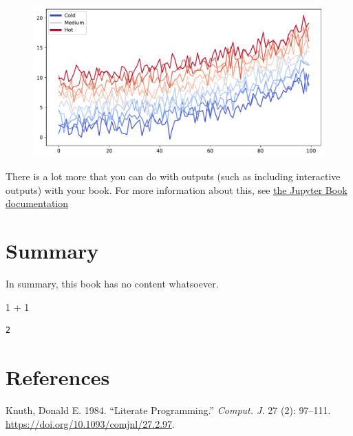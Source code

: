 \documentclass[
  letterpaper,
  DIV=11,
  numbers=noendperiod]{scrreprt}
\newenvironment{Shaded}{\begin{snugshade}}{\end{snugshade}}
\newcommand{\DecValTok}[1]{\textcolor[rgb]{0.68,0.00,0.00}{#1}}
\newcommand{\OperatorTok}[1]{\textcolor[rgb]{0.37,0.37,0.37}{#1}}
\newlength{\cslhangindent}
\newlength{\cslentryspacingunit} %
\newenvironment{CSLReferences}[2] %
 {%
  \setlength{\parindent}{0pt}
  \ifodd #1
  \let\oldpar\par
  \def\par{\hangindent=\cslhangindent\oldpar}
  \fi
  \setlength{\parskip}{#2\cslentryspacingunit}
 }%
 {}
\begin{document}
\begin{figure}[H]

{\centering \includegraphics{content/jupyterbook-demo/notebooks_files/figure-pdf/cell-3-output-1.pdf}

}

\end{figure}

There is a lot more that you can do with outputs (such as including
interactive outputs) with your book. For more information about this,
see \href{https://jupyterbook.org}{the Jupyter Book documentation}


\hypertarget{summary}{%
\chapter{Summary}\label{summary}}

In summary, this book has no content whatsoever.

\begin{Shaded}
\begin{Highlighting}[]
\DecValTok{1} \OperatorTok{+} \DecValTok{1}
\end{Highlighting}
\end{Shaded}

\begin{verbatim}
2
\end{verbatim}


\hypertarget{references}{%
\chapter*{References}\label{references}}


\hypertarget{refs}{}
\begin{CSLReferences}{1}{0}
\leavevmode{}%
Knuth, Donald E. 1984. {``Literate Programming.''} \emph{Comput. J.} 27
(2): 97--111. \url{https://doi.org/10.1093/comjnl/27.2.97}.

\end{CSLReferences}
\end{document}
